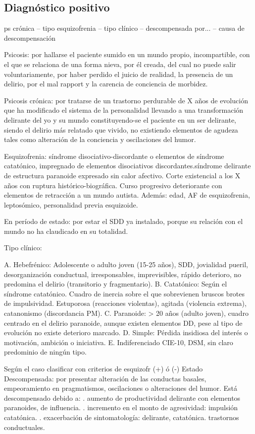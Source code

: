 \documentclass{scrbook}
\begin{document}
\subsection*{Diagnóstico positivo}
ps crónica – tipo esquizofrenia – tipo clínico – descompensada por... – causa de descompensación

Psicosis: por hallarse el paciente sumido en un mundo propio, incompartible, con el que se relaciona de una forma nieva, por él creada, del cual no puede salir voluntariamente, por haber perdido el juicio de realidad, la presencia de un delirio, por el mal rapport y la carencia de conciencia de morbidez.

Psicosis crónica: por tratarse de un trastorno perdurable de X años de evolución que ha modificado el sistema de la personalidad llevando a una transformación delirante del yo y su mundo constituyendo-se el paciente en un ser delirante, siendo el delirio más relatado que vivido, no existiendo elementos de agudeza tales como alteración de la conciencia y oscilaciones del humor.

Esquizofrenia: síndrome disociativo-discordante o elementos de síndrome catatónico, impregnado de elementos disociativos discordantes.síndrome delirante de estructura paranoide expresado sin calor afectivo. Corte existencial a los X años con ruptura histórico-biográfica. Curso progresivo deteriorante con elementos de retracción a un mundo autista. Además: edad, AF de esquizofrenia, leptosómico, personalidad previa esquizoide.

En período de estado: por estar el SDD ya instalado, porque su relación con el mundo no ha claudicado en su totalidad. 

Tipo clínico: 

A. Hebefrénico: Adolescente o adulto joven (15-25 años), SDD, jovialidad pueril, desorganización conductual, irresponsables, imprevisibles, rápido deterioro, no predomina el delirio (transitorio y fragmentario). 
B. Catatónico: Según el síndrome catatónico. Cuadro de inercia sobre el que sobrevienen bruscos brotes de impulsividad. Estuporosa (reacciones violentas), agitada (violencia extrema), catanonismo (discordancia PM). 
C. Paranoide: > 20 años (adulto joven), cuadro centrado en el delirio paranoide, aunque existen elementos DD, pese al tipo de evolución no existe deterioro marcado. 
D. Simple: Pérdida insidiosa del interés o motivación, ambición o iniciativa. 
E. Indiferenciado CIE-10, DSM, sin claro predominio de ningún tipo.

Según el caso clasificar con criterios de esquizofr (+) ó (-) Estado Descompensada: por presentar alteración de las conductas basales, empeoramiento en pragmatismos, oscilaciones o alteraciones del humor. Está descompensado debido a: . aumento de productividad delirante con elementos paranoides, de influencia. . incremento en el monto de agresividad: impulsión catatónica. . exacerbación de sintomatología: delirante, catatónica. trastornos conductuales.
\end{document}
